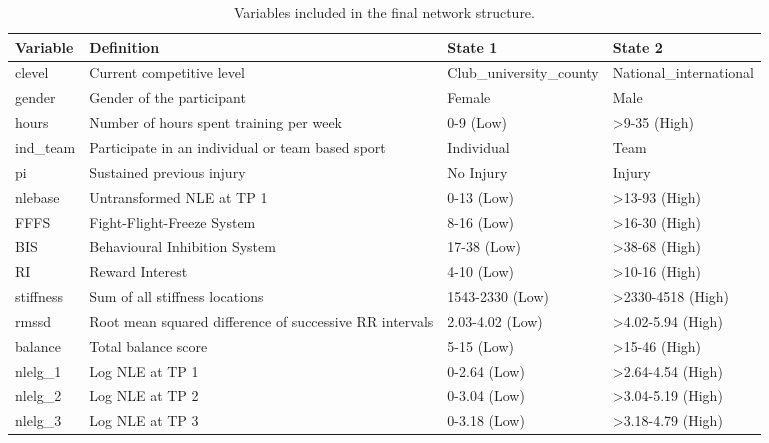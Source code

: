 \documentclass[utf8]{frontiersHLTH}
\begin{document}
\begin{table}[H]
\begin{adjustwidth}{-2.25in}{0in}
\caption{\label{tab:table3}Variables included in the final network structure.}
\centering
\begin{tabular}{l|l|l|l}
\hline
{\bf Variable} & {\bf Definition} & {\bf State} 1 & {\bf State 2}\\
\hline
clevel & Current competitive level & Club\_university\_county & National\_international\\
\hline
gender & Gender of the participant & Female & Male\\
\hline
hours & Number of hours spent training per week & 0-9 (Low) & >9-35 (High)\\
\hline
ind\_team & Participate in an individual or team based sport & Individual & Team\\
\hline
pi & Sustained previous injury & No Injury & Injury\\
\hline
nlebase & Untransformed NLE at TP 1 & 0-13 (Low) & >13-93 (High)\\
\hline
FFFS & Fight-Flight-Freeze System & 8-16 (Low) & >16-30 (High)\\
\hline
BIS & Behavioural Inhibition System & 17-38 (Low) & >38-68 (High)\\
\hline
RI & Reward Interest & 4-10 (Low) & >10-16 (High)\\
\hline
stiffness & Sum of all stiffness locations & 1543-2330 (Low) & >2330-4518 (High)\\
\hline
rmssd & Root mean squared difference of successive RR intervals & 2.03-4.02 (Low) & >4.02-5.94 (High)\\
\hline
balance & Total balance score & 5-15 (Low) & >15-46 (High)\\
\hline
nlelg\_1 & Log NLE at TP 1 & 0-2.64 (Low) & >2.64-4.54 (High)\\
\hline
nlelg\_2 & Log NLE at TP 2 & 0-3.04 (Low) & >3.04-5.19 (High)\\
\hline
nlelg\_3 & Log NLE at TP 3 & 0-3.18 (Low) & >3.18-4.79 (High)\\
\hline
\end{tabular}
\end{adjustwidth}
\end{table}
\end{document}
